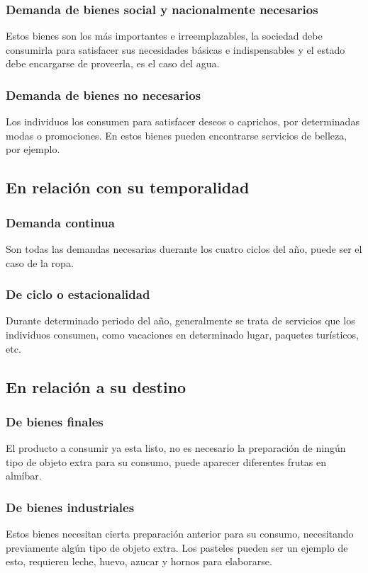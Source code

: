\documentclass[11pt,letterpaper]{article}
\begin{document}
\subsubsection*{Demanda de bienes social y nacionalmente necesarios}
Estos bienes son los más importantes e irreemplazables, la sociedad debe consumirla para satisfacer sus necesidades básicas e indispensables y el estado debe encargarse de proveerla, es el caso del agua.
\subsubsection*{Demanda de bienes no necesarios}
Los individuos los consumen para satisfacer deseos o caprichos, por determinadas modas o promociones. En estos bienes pueden encontrarse servicios de belleza, por ejemplo.
\subsection{En relación con su temporalidad}
\subsubsection*{Demanda continua}
Son todas las demandas necesarias duerante los cuatro ciclos del año, puede ser el caso de la ropa.
\subsubsection*{De ciclo o estacionalidad}
Durante determinado periodo del año, generalmente se trata de servicios que los individuos consumen, como vacaciones en determinado lugar, paquetes turísticos, etc.
\subsection{En relación a su destino}
\subsubsection*{De bienes finales}
El producto a consumir ya esta listo, no es necesario la preparación de ningún tipo de objeto extra para su consumo, puede aparecer diferentes frutas en almíbar.
\subsubsection*{De bienes industriales}
Estos bienes necesitan cierta preparación anterior para su consumo, necesitando previamente algún tipo de objeto extra. Los pasteles pueden ser un ejemplo de esto, requieren leche, huevo, azucar y hornos para elaborarse.
\end{document}
